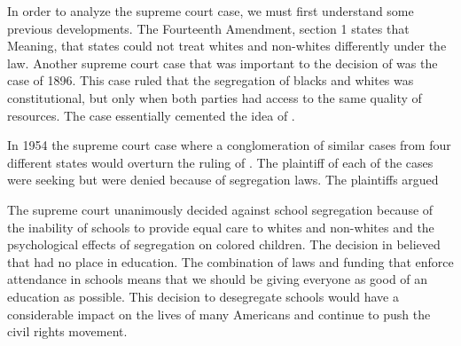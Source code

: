 In order to analyze the  supreme court case, we must first understand some previous developments.
The Fourteenth Amendment, section 1 states that  \autocite{14th} Meaning, that states could not treat whites and non-whites differently under the law.
Another supreme court case that was important to the decision of  was the  case of 1896.
This case ruled that the segregation of blacks and whites was constitutional, but only when both parties had access to the same quality of resources.
The  case essentially cemented the idea of .\autocite{plessy}

In 1954 the supreme court case  where a conglomeration of similar cases from four different states would overturn the ruling of .
The plaintiff of each of the cases were seeking  \autocite{brown} but were denied because of segregation laws.
The plaintiffs argued  \autocite{brown}

The supreme court unanimously decided against school segregation because of the inability of schools to provide equal care to whites and non-whites and the psychological effects of segregation on colored children.
The decision in  believed that  had no place in education.
The combination of laws and funding that enforce attendance in schools means that we should be giving everyone as good of an education as possible.
This decision to desegregate schools would have a considerable impact on the lives of many Americans and continue to push the civil rights movement.